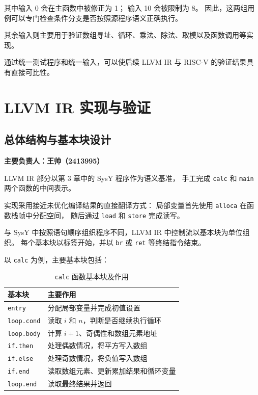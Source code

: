 \documentclass[12pt,a4paper]{ctexart}
\begin{document}
其中输入 0 会在主函数中被修正为 1；
输入 10 会被限制为 8。
因此，这两组用例可以专门检查条件分支是否按照源程序语义正确执行。

其余输入则主要用于验证数组寻址、循环、乘法、除法、取模以及函数调用等实现。

通过统一测试程序和统一输入，可以使后续 LLVM IR 与 RISC-V 的验证结果具有直接可比性。


\section{LLVM IR 实现与验证}

\subsection{总体结构与基本块设计}

\noindent
\textbf{主要负责人：王帅（2413995）}

LLVM IR 部分以第 3 章中的 SysY 程序作为语义基准，
手工完成 \texttt{calc} 和 \texttt{main} 两个函数的中间表示。

实现采用接近未优化编译结果的直接翻译方式：
局部变量首先使用 \texttt{alloca} 在函数栈帧中分配空间，
随后通过 \texttt{load} 和 \texttt{store} 完成读写。

与 SysY 中按照语句顺序组织程序不同，LLVM IR 中控制流以基本块为单位组织。
每个基本块以标签开始，并以 \texttt{br} 或 \texttt{ret} 等终结指令结束。

以 \texttt{calc} 为例，主要基本块包括：

\begin{table}[H]
\centering
\caption{\texttt{calc} 函数基本块及作用}
\begin{tabularx}{\textwidth}{@{}p{3.0cm}X@{}}
\toprule
基本块 & 主要作用 \\
\midrule

\texttt{entry} &
分配局部变量并完成初值设置 \\

\texttt{loop.cond} &
读取 $i$ 和 $n$，判断是否继续执行循环 \\

\texttt{loop.body} &
计算 $i+1$、奇偶性和数组元素地址 \\

\texttt{if.then} &
处理偶数情况，将平方写入数组 \\

\texttt{if.else} &
处理奇数情况，将负值写入数组 \\

\texttt{if.end} &
读取数组元素、更新累加结果和循环变量 \\

\texttt{loop.end} &
读取最终结果并返回 \\

\bottomrule
\end{tabularx}
\end{table}
\end{document}
